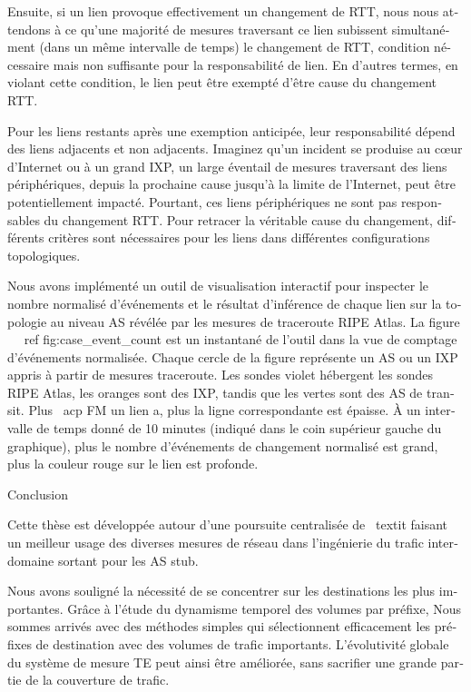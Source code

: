 \begin{otherlanguage}{french}
Ensuite, si un lien provoque effectivement un changement de RTT, nous nous attendons à ce qu'une majorité de mesures traversant ce lien subissent simultanément (dans un même intervalle de temps) le changement de RTT, condition nécessaire mais non suffisante pour la responsabilité de lien. En d'autres termes, en violant cette condition, le lien peut être exempté d'être cause du changement RTT.

Pour les liens restants après une exemption anticipée, leur responsabilité dépend des liens adjacents et non adjacents. Imaginez qu'un incident se produise au cœur d'Internet ou à un grand IXP, un large éventail de mesures traversant des liens périphériques, depuis la prochaine cause jusqu'à la limite de l'Internet, peut être potentiellement impacté. Pourtant, ces liens périphériques ne sont pas responsables du changement RTT.
Pour retracer la véritable cause du changement, différents critères sont nécessaires pour les liens dans différentes configurations topologiques.

Nous avons implémenté un outil de visualisation interactif pour inspecter le nombre normalisé d'événements et le résultat d'inférence de chaque lien sur la topologie au niveau AS révélée par les mesures de traceroute RIPE Atlas.
La figure ~ \ ref {fig:case_event_count} est un instantané de l'outil dans la vue de comptage d'événements normalisée.
Chaque cercle de la figure représente un AS ou un IXP appris à partir de mesures traceroute. Les sondes violet hébergent les sondes RIPE Atlas, les oranges sont des IXP, tandis que les vertes sont des AS de transit. Plus \ acp {FM} un lien a, plus la ligne correspondante est épaisse. À un intervalle de temps donné de 10 minutes (indiqué dans le coin supérieur gauche du graphique), plus le nombre d'événements de changement normalisé est grand, plus la couleur rouge sur le lien est profonde.

Conclusion

Cette thèse est développée autour d'une poursuite centralisée de \ textit {faisant un meilleur usage des diverses mesures de réseau dans l'ingénierie du trafic interdomaine sortant pour les AS stub}.

Nous avons souligné la nécessité de se concentrer sur les destinations les plus importantes.
Grâce à l'étude du dynamisme temporel des volumes par préfixe,
Nous sommes arrivés avec des méthodes simples qui sélectionnent efficacement les préfixes de destination avec des volumes de trafic importants.
L'évolutivité globale du système de mesure TE peut ainsi être améliorée, sans sacrifier une grande partie de la couverture de trafic.


\end{otherlanguage}
